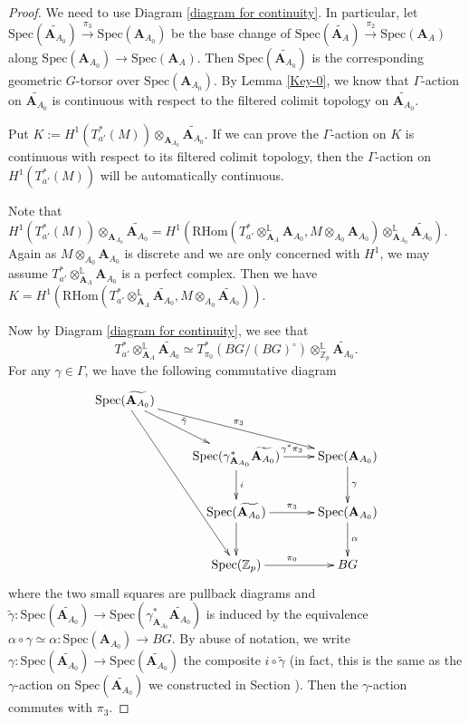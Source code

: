 \documentclass[10pt]{article}
\numberwithin{equation}{section}
\newcommand{\bL}{{\mathbb L}}
\newcommand{\bZ}{{\mathbb Z}}
\newcommand{\Spec}{{\mathrm{Spec}}}         %
\newcommand{\bfA}{{\textbf{A}}}
\newcommand{\RHom}{{\mathrm{RHom}}}
\begin{document}
\begin{proof}
    We need to use Diagram \ref{diagram for continuity}. In particular, let $\Spec(\widetilde{\bfA_{A_0}})\xrightarrow{\pi_3}\Spec(\bfA_{A_0})$ be the base change of $\Spec(\widetilde{\bfA_{A}})\xrightarrow{\pi_2}\Spec(\bfA_{A})$ along $\Spec(\bfA_{A_0})\to \Spec(\bfA_A)$. Then $\Spec(\widetilde{\bfA_{A_0}})$ is the corresponding geometric $G$-torsor over $\Spec(\bfA_{A_0})$. By Lemma \ref{Key-0}, we know that $\Gamma$-action on $\widetilde{\bfA_{A_0}}$ is continuous with respect to the filtered colimit topology on $\widetilde{\bfA_{A_0}}$.

  Put $K:=H^1(T^*_{a'}(M))\otimes_{\bfA_{A_0}}\widetilde{\bfA_{A_0}}$. If we can prove the $\Gamma$-action on $K$ is continuous with respect to its filtered colimit topology, then the $\Gamma$-action on $H^1(T^*_{a'}(M))$ will be automatically continuous.

  Note that $H^1(T^*_{a'}(M))\otimes_{\bfA_{A_0}}\widetilde{\bfA_{A_0}}=H^1(\RHom(T^*_{a'}\otimes^{\bL}_{\bfA_A}\bfA_{A_0},M\otimes_{A_0}\bfA_{A_0})\otimes^{\bL}_{\bfA_{A_0}}\widetilde{\bfA_{A_0}})$. Again as $M\otimes_{A_0}\bfA_{A_0}$ is discrete and we are only concerned with $H^1$, we may assume $T^*_{a'}\otimes^{\bL}_{\bfA_A}\bfA_{A_0}$ is a perfect complex. Then we have $K=H^1(\RHom(T^*_{a'}\otimes^{\bL}_{\bfA_A}\widetilde{\bfA_{A_0}}, M\otimes_{A_0}\widetilde{\bfA_{A_0}}))$.

  Now by Diagram \ref{diagram for continuity}, we see that 
  \[
  T^*_{a'}\otimes^{\bL}_{\bfA_A}\widetilde{\bfA_{A_0}}\simeq T^*_{\pi_0}(BG/(BG)^{\circ})\otimes_{\bZ_p}^{\bL}\widetilde{\bfA_{A_0}}.
  \]
  For any $\gamma\in \Gamma$, we have the following commutative diagram
  \begin{equation}
      \xymatrix{
      \Spec(\widetilde{\bfA_{A_0}})\ar[rddd]\ar[rrd]^{\pi_3}\ar[rd]^{\tilde\gamma}& &\\
      & \Spec(\gamma^*_{\bfA_{A_0}}\widetilde{\bfA_{A_0}})\ar[r]^{\gamma^*\pi_3}\ar[d]^{i}& \Spec(\bfA_{A_0})\ar[d]^{\gamma}\\
      &\Spec(\widetilde{\bfA_{A_0}})\ar[d]\ar[r]^{\pi_3}&\Spec(\bfA_{A_0})\ar[d]^{\alpha}\\
      &\Spec(\bZ_p)\ar[r]^{\pi_0}& BG
      }
  \end{equation}
  where the two small squares are pullback diagrams and $\tilde \gamma:\Spec(\widetilde{\bfA_{A_0}})\to \Spec(\gamma^*_{\bfA_{A_0}}\widetilde{\bfA_{A_0}})$ is induced by the equivalence $\alpha\circ \gamma\simeq \alpha: \Spec(\bfA_{A_0})\to BG$. By abuse of notation, we write $\gamma:\Spec(\widetilde{\bfA_{A_0}})\to \Spec(\widetilde{\bfA_{A_0}})$ the composite $i\circ \tilde\gamma$ (in fact, this is the same as the $\gamma$-action on $\Spec(\widetilde{\bfA_{A_0}})$ we constructed in Section ). Then the $\gamma$-action commutes with $\pi_3$.


\end{proof}
\end{document}
